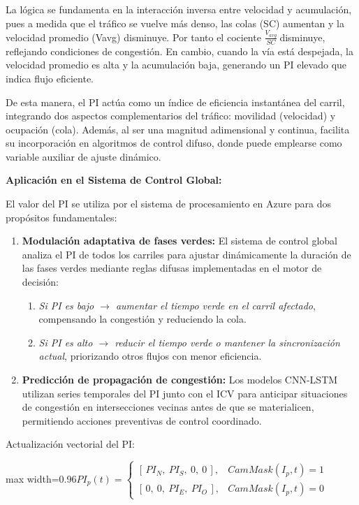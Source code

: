 \documentclass[12pt,a4paper,oneside]{report}
\newenvironment{centeredmath}
  {\begin{center}\begin{adjustbox}{max width=0.96\linewidth}\(\displaystyle}
  {\)\end{adjustbox}\end{center}}
\begin{document}
La lógica se fundamenta en la interacción inversa entre velocidad y acumulación, pues a medida que el tráfico se vuelve más denso, las colas (SC) aumentan y la velocidad promedio (Vavg) disminuye. Por tanto el cociente \(\frac{V_{avg}}{SC}\ \)disminuye, reflejando condiciones de congestión. En cambio, cuando la vía está despejada, la velocidad promedio es alta y la acumulación baja, generando un PI elevado que indica flujo eficiente.

De esta manera, el PI actúa como un índice de eficiencia instantánea del carril, integrando dos aspectos complementarios del tráfico: movilidad (velocidad) y ocupación (cola). Además, al ser una magnitud adimensional y continua, facilita su incorporación en algoritmos de control difuso, donde puede emplearse como variable auxiliar de ajuste dinámico.

\textbf{Aplicación en el Sistema de Control Global:}

El valor del PI se utiliza por el sistema de procesamiento en Azure para dos propósitos fundamentales:

\begin{enumerate}
\def\labelenumi{\arabic{enumi}.}
\item
  \textbf{Modulación adaptativa de fases verdes:} El sistema de control global analiza el PI de todos los carriles para ajustar dinámicamente la duración de las fases verdes mediante reglas difusas implementadas en el motor de decisión:

  \begin{enumerate}
  \def\labelenumii{\alph{enumii}.}
  \item
    \emph{Si PI es bajo \ensuremath{\rightarrow} aumentar el tiempo verde en el carril afectado}, compensando la congestión y reduciendo la cola.
  \item
    \emph{Si PI es alto \ensuremath{\rightarrow} reducir el tiempo verde o mantener la sincronización actual}, priorizando otros flujos con menor eficiencia.
  \end{enumerate}
\item
  \textbf{Predicción de propagación de congestión:} Los modelos CNN-LSTM utilizan series temporales del PI junto con el ICV para anticipar situaciones de congestión en intersecciones vecinas antes de que se materialicen, permitiendo acciones preventivas de control coordinado.
\end{enumerate}

Actualización vectorial del PI:

\begin{centeredmath}
PI_{p}(t) =
\begin{cases}
\left[\, PI_{N},\ PI_{S},\ 0,\ 0 \,\right], & CamMask(I_{p},t) = 1\\[2pt]
\left[\, 0,\ 0,\ PI_{E},\ PI_{O} \,\right], & CamMask(I_{p},t) = 0
\end{cases}
\end{centeredmath}
\end{document}
